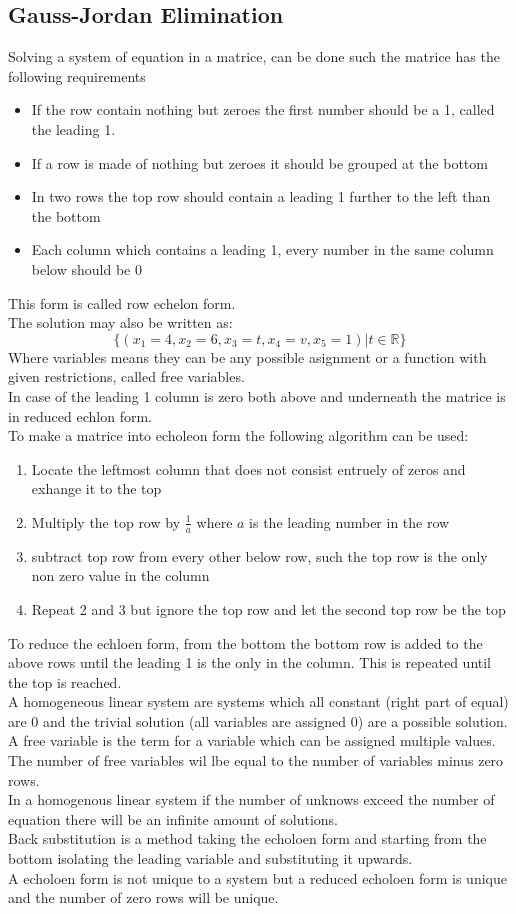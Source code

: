 \documentclass[12pt, a4paper]{article}
\begin{document}
		\subsection{Gauss-Jordan Elimination}
			Solving a system of equation in a matrice, can be done such the matrice has the following requirements
			\begin{itemize}
				\item If the row contain nothing but zeroes the first number should be a 1, called the leading 1.
				\item If a row is made of nothing but zeroes it should be grouped at the bottom
				\item In two rows the top row should contain a leading 1 further to the left than the bottom
				\item Each column which contains a leading 1, every number in the same column below should be 0
			\end{itemize}
			This form is called row echelon form.\\
			The solution may also be written as:
			$$\{(x_1=4,x_2=6,x_3=t,x_4=v,x_5=1)|t\in \mathbb{R} \}$$
			Where variables means they can be any possible asignment or a function with given restrictions, called free variables.\\
			In case of the leading 1 column is zero both above and underneath the matrice is in reduced echlon form.\\[4mm]
			To make a matrice into echoleon form the following algorithm can be used:\\
			\begin{enumerate}
				\item Locate the leftmost column that does not consist entruely of zeros and exhange it to the top
				\item Multiply the top row by $\frac{1}{a}$ where $a$ is the leading number in the row
				\item subtract top row from every other below row, such the top row is the only non zero value in the column
				\item Repeat 2 and 3 but ignore the top row and let the second top row be the top
			\end{enumerate}
			To reduce the echloen form, from the bottom the bottom row is added to the above rows until the leading 1 is the only in the column. This is repeated until the top is reached.\\
			A homogeneous linear system are systems which all constant (right part of equal) are 0 and the trivial solution (all variables are assigned 0) are a possible solution.\\
			A free variable is the term for a variable which can be assigned multiple values. The number of free variables wil lbe equal to the number of variables minus zero rows.\\
			In a homogenous linear system if the number of unknows exceed the number of equation there will be an infinite amount of solutions.\\
			Back substitution is a method taking the echoloen form and starting from the bottom isolating the leading variable and substituting it upwards.\\
			A echoloen form is not unique to a system but a reduced echoloen form is unique and the number of zero rows will be unique.
\end{document}
